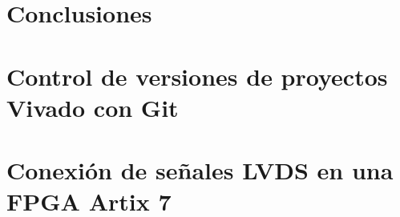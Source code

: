 \documentclass[11pt,letterpaper,oneside]{phstylee}
\begin{document}
\newpage
\thispagestyle{empty}
\cleardoublepage

\chapter{Conclusiones}
\label{cap:conclusiones}


\newpage
\thispagestyle{empty}
\cleardoublepage



\appendix
\chapter{Control de versiones de proyectos Vivado con Git}
\label{cap:git}


\chapter{Conexión de señales LVDS en una FPGA Artix 7}
\label{cap:lvds}


%
%
%




\end{document}
